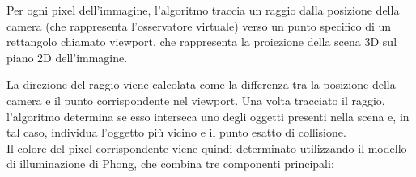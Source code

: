 \documentclass{article}
\begin{document}
Per ogni pixel dell'immagine, l'algoritmo traccia un raggio dalla posizione della camera (che rappresenta l'osservatore virtuale) verso un punto specifico di un rettangolo chiamato viewport, che rappresenta la proiezione della scena 3D sul piano 2D dell'immagine.

La direzione del raggio viene calcolata come la differenza tra la posizione della camera e il punto corrispondente nel viewport.
Una volta tracciato il raggio, l'algoritmo determina se esso interseca uno degli oggetti presenti nella scena e, in tal caso, individua l'oggetto più vicino e il punto esatto di collisione.\\

Il colore del pixel corrispondente viene quindi determinato utilizzando il modello di illuminazione di Phong\cite{Phong}, che combina tre componenti principali:
\end{document}
